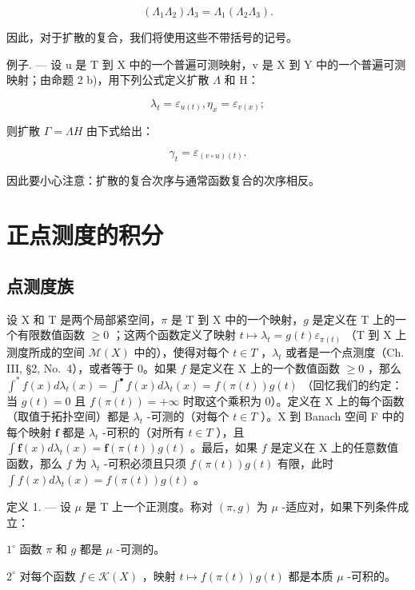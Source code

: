 \[
(\Lambda_ {1} \Lambda_ {2}) \Lambda_ {3} = \Lambda_ {1} (\Lambda_ {2} \Lambda_ {3}).
\]

因此，对于扩散的复合，我们将使用这些不带括号的记号。

例子. --- 设 u 是 T 到 X 中的一个普遍可测映射，v 是 X 到 Y 中的一个普遍可测映射；由命题 2 b)，用下列公式定义扩散 \(\Lambda\) 和 H：

\[
\lambda_ {t} = \varepsilon_ {u (t)}, \eta_ {x} = \varepsilon_ {v (x)};
\]

则扩散 \(\Gamma = \Lambda H\) 由下式给出：

\[
\gamma_ {t} = \varepsilon_ {(v \circ u) (t)}.
\]

因此要小心注意：扩散的复合次序与通常函数复合的次序相反。

\section{正点测度的积分}

\subsection{点测度族}

设 X 和 T 是两个局部紧空间，\(\pi\) 是 T 到 X 中的一个映射，\(g\) 是定义在 T 上的一个有限数值函数 \(\geqslant 0\) ；这两个函数定义了映射 \(t \mapsto \lambda_t = g(t)\varepsilon_{\pi(t)}\) （T 到 X 上测度所成的空间 \(\mathcal{M}(X)\) 中的），使得对每个 \(t \in T\) ，\(\lambda_t\) 或者是一个点测度（Ch. III, §2, No.~4），或者等于 0。如果 \(f\) 是定义在 X 上的一个数值函数 \(\geqslant 0\) ，那么 \(\int^{*} f(x) d\lambda_t(x) = \int^{\bullet} f(x) d\lambda_t(x) = f(\pi(t))g(t)\) （回忆我们的约定：当 \(g(t) = 0\) 且 \(f(\pi(t)) = +\infty\) 时取这个乘积为 0）。定义在 X 上的每个函数（取值于拓扑空间）都是 \(\lambda_t\) -可测的（对每个 \(t \in T\) ）。X 到 Banach 空间 F 中的每个映射 \(\mathbf{f}\) 都是 \(\lambda_t\) -可积的（对所有 \(t \in T\) ），且 \(\int \mathbf{f}(x) d\lambda_t(x) = \mathbf{f}(\pi(t))g(t)\) 。最后，如果 \(f\) 是定义在 X 上的任意数值函数，那么 \(f\) 为 \(\lambda_t\) -可积必须且只须 \(f(\pi(t))g(t)\) 有限，此时 \(\int f(x) d\lambda_t(x) = f(\pi(t))g(t)\) 。

定义 1. --- 设 \(\mu\) 是 T 上一个正测度。称对 \((\pi, g)\) 为 \(\mu\) -适应对，如果下列条件成立：

\(1^{\circ}\) 函数 \(\pi\) 和 \(g\) 都是 \(\mu\) -可测的。

\(2^{\circ}\) 对每个函数 \(f \in \mathcal{K}(X)\) ，映射 \(t \mapsto f(\pi(t))g(t)\) 都是本质 \(\mu\) -可积的。

